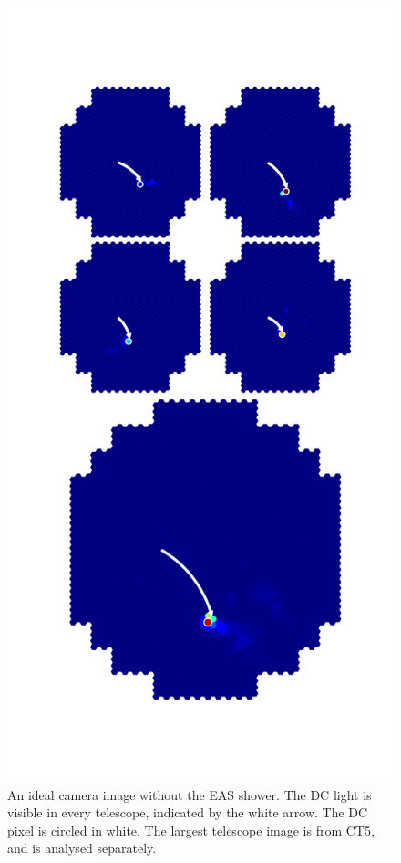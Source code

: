 \documentclass[11pt]{article}
\begin{document}
\begin{figure}
\begin{minipage}{0.45\textwidth}
\includegraphics[trim=80 120 80 150,clip,width=\textwidth]{graphDC}
\caption{An ideal camera image without the EAS shower. The DC light is visible in every telescope, indicated by the white arrow. The DC pixel is circled in white. The largest telescope image is from CT5, and is analysed separately.}

\end{minipage}
\end{figure}
\end{document}
